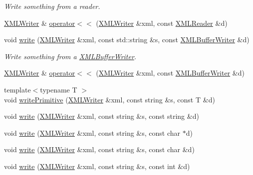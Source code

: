 \begin{DoxyCompactItemize}
\begin{DoxyCompactList}\small\item\em Write something from a reader. \end{DoxyCompactList}\item 
\mbox{\hyperlink{classADATXML_1_1XMLWriter}{X\+M\+L\+Writer}} \& \mbox{\hyperlink{group__io_gaeedb0da293eebaa00dff464efbb18eab}{operator$<$$<$}} (\mbox{\hyperlink{classADATXML_1_1XMLWriter}{X\+M\+L\+Writer}} \&xml, const \mbox{\hyperlink{classADATXML_1_1XMLReader}{X\+M\+L\+Reader}} \&d)
\item 
void \mbox{\hyperlink{group__io_ga14c568a7a3ffb3e486c9036ff7382f8e}{write}} (\mbox{\hyperlink{classADATXML_1_1XMLWriter}{X\+M\+L\+Writer}} \&xml, const std\+::string \&s, const \mbox{\hyperlink{classADATXML_1_1XMLBufferWriter}{X\+M\+L\+Buffer\+Writer}} \&d)
\begin{DoxyCompactList}\small\item\em Write something from a \mbox{\hyperlink{classADATXML_1_1XMLBufferWriter}{X\+M\+L\+Buffer\+Writer}}. \end{DoxyCompactList}\item 
\mbox{\hyperlink{classADATXML_1_1XMLWriter}{X\+M\+L\+Writer}} \& \mbox{\hyperlink{group__io_ga5f6c03929b05296b731cf36fb65cf9c6}{operator$<$$<$}} (\mbox{\hyperlink{classADATXML_1_1XMLWriter}{X\+M\+L\+Writer}} \&xml, const \mbox{\hyperlink{classADATXML_1_1XMLBufferWriter}{X\+M\+L\+Buffer\+Writer}} \&d)
\item 
{\footnotesize template$<$typename T $>$ }\\void \mbox{\hyperlink{namespaceADATXML_ac21baf6aebab16f5e0425a455d5868a6}{write\+Primitive}} (\mbox{\hyperlink{classADATXML_1_1XMLWriter}{X\+M\+L\+Writer}} \&xml, const string \&s, const T \&d)
\item 
void \mbox{\hyperlink{namespaceADATXML_ad05599b1c54c5e920891cbcce093a4bc}{write}} (\mbox{\hyperlink{classADATXML_1_1XMLWriter}{X\+M\+L\+Writer}} \&xml, const string \&s, const string \&d)
\item 
void \mbox{\hyperlink{namespaceADATXML_ad11e81d6d4aa85c354971b245aee9581}{write}} (\mbox{\hyperlink{classADATXML_1_1XMLWriter}{X\+M\+L\+Writer}} \&xml, const string \&s, const char $\ast$d)
\item 
void \mbox{\hyperlink{namespaceADATXML_a366a5afc8f6a783dc42a12c7aa446c4a}{write}} (\mbox{\hyperlink{classADATXML_1_1XMLWriter}{X\+M\+L\+Writer}} \&xml, const string \&s, const char \&d)
\item 
void \mbox{\hyperlink{namespaceADATXML_a9c82065f9ae0cd8f8cf613bebc0c60fc}{write}} (\mbox{\hyperlink{classADATXML_1_1XMLWriter}{X\+M\+L\+Writer}} \&xml, const string \&s, const int \&d)

\end{DoxyCompactItemize}
